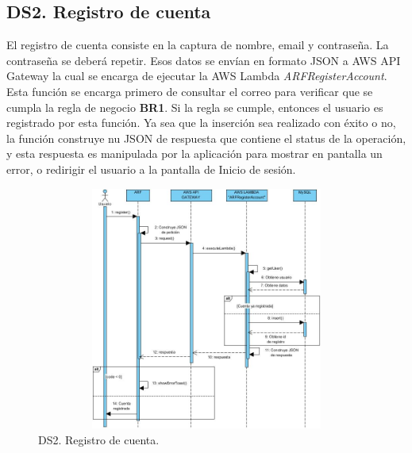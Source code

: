 \subsection{DS2. Registro de cuenta}
El registro de cuenta consiste en la captura de nombre, email y contraseña. La contraseña se deberá repetir. Esos datos se envían en formato JSON a AWS API Gateway la cual se encarga de ejecutar la AWS Lambda \textit{ARFRegisterAccount}. Esta función se encarga primero de consultar el correo para verificar que se cumpla la regla de negocio \textbf{BR1}. Si la regla se cumple, entonces el usuario es registrado por esta función. Ya sea que la inserción sea realizado con éxito o no, la función construye nu JSON de respuesta que contiene el status de la operación, y esta respuesta es manipulada por la aplicación para mostrar en pantalla un error, o redirigir el usuario a la pantalla de Inicio de sesión.

\begin{figure}[h!]
	\centering
	\includegraphics[width=14cm,height=8cm]{imagenes/analisis/ds/RegCuenta.jpg}
	\caption{DS2. Registro de cuenta.}
	\label{fig:dsregcuenta}
\end{figure}


